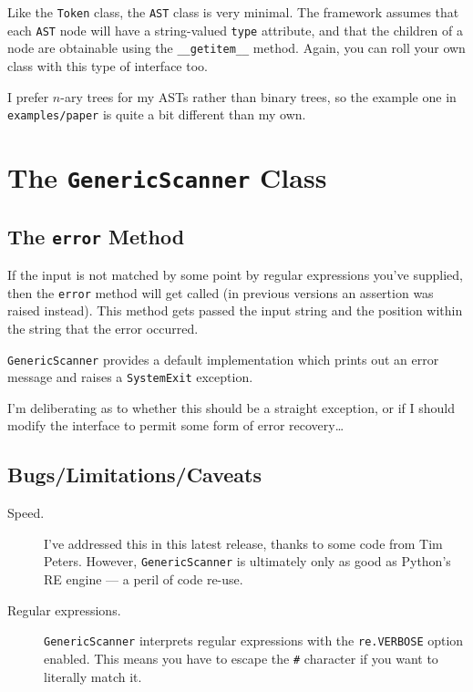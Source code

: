 \documentclass{article}
\newcommand{\code}[1]{\texttt{#1}}
\begin{document}
Like the \code{Token} class, the \code{AST} class is very minimal.  The
framework assumes that each \code{AST} node will have a string-valued
\code{type} attribute, and that the children of a node are obtainable
using the \code{\_\_getitem\_\_} method.  Again, you can roll your own
class with this type of interface too.

I prefer $n$-ary trees for my ASTs rather than binary trees, so the
example one in \code{examples/paper} is quite a bit different than my own.

\section{The \code{GenericScanner} Class}

\subsection{The \code{error} Method}

If the input is not matched by some point by regular expressions you've
supplied, then the \code{error} method will get called (in previous
versions an assertion was raised instead).  This method gets passed
the input string and the position within the string that the error
occurred.

\code{GenericScanner} provides a default implementation which prints out
an error message and raises a \code{SystemExit} exception.

I'm deliberating as to whether this should be a straight exception, or
if I should modify the interface to permit some form of error recovery\ldots

\subsection{Bugs/Limitations/Caveats}

\begin{description}

\item[Speed.]  I've addressed this in this latest release, thanks to
	some code from Tim Peters.  However, \code{GenericScanner} is
	ultimately only as good as Python's RE engine --- a peril of
	code re-use.

\item[Regular expressions.]  \code{GenericScanner} interprets regular
	expressions with the \code{re.VERBOSE} option enabled.  This
	means you have to escape the \code{\#} character if you want
	to literally match it.

\end{description}
\end{document}
